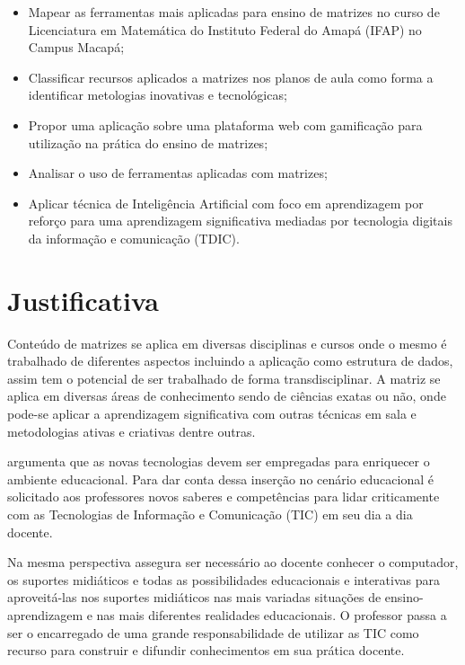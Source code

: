 \begin{itemize}
    \item Mapear as ferramentas mais aplicadas para ensino de matrizes no curso de Licenciatura em Matemática do Instituto Federal do Amapá (IFAP) no Campus Macapá;

    \item Classificar recursos aplicados a matrizes nos planos de aula como forma a identificar metologias inovativas e tecnológicas;

    \item Propor uma aplicação sobre uma plataforma web com gamificação  para utilização na prática do ensino de matrizes;
    
    \item Analisar o uso de ferramentas aplicadas com matrizes;
    
    \item Aplicar técnica de Inteligência Artificial com foco em aprendizagem por reforço para uma aprendizagem significativa mediadas por tecnologia digitais da informação e comunicação (TDIC).
    
\end{itemize}




            
\section{Justificativa}
\label{sec:justificativa}

Conteúdo de matrizes se aplica em diversas disciplinas e cursos onde o mesmo é trabalhado de diferentes aspectos incluindo a aplicação como estrutura de dados, assim tem o potencial de ser trabalhado de forma transdisciplinar. A matriz se aplica em diversas áreas de conhecimento sendo de ciências exatas ou não, onde pode-se aplicar a aprendizagem significativa com outras técnicas em sala e metodologias ativas e criativas dentre outras.

 argumenta que as novas tecnologias devem ser empregadas para enriquecer o ambiente educacional. Para dar conta dessa inserção no cenário educacional é solicitado aos professores novos saberes e competências para lidar criticamente com as Tecnologias de Informação e Comunicação (TIC) em seu dia a dia docente.

Na mesma perspectiva  assegura ser necessário ao docente conhecer o computador, os suportes midiáticos e todas as possibilidades educacionais e interativas para aproveitá-las nos suportes midiáticos nas mais variadas situações de ensino-aprendizagem e nas mais diferentes realidades educacionais. O professor passa a ser o encarregado de uma grande responsabilidade de utilizar as TIC como recurso para construir e difundir conhecimentos em sua prática docente.


